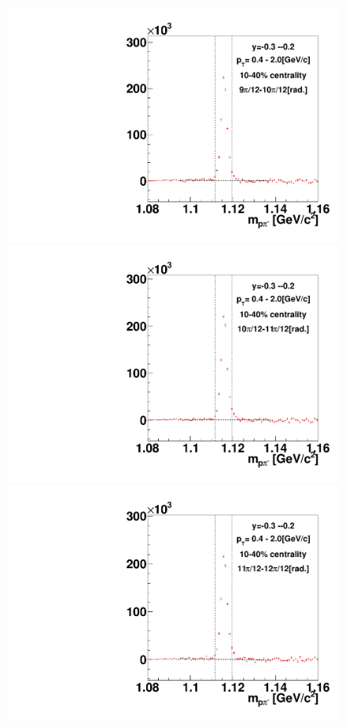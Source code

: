 \begin{figure}[h]
\includegraphics[width=0.14\linewidth]{chapterX/fig/ld_v1_sig/kf_ptslice0_cent1_ld_flow_phi10_rap7.pdf}
\includegraphics[width=0.14\linewidth]{chapterX/fig/ld_v1_sig/kf_ptslice0_cent1_ld_flow_phi11_rap7.pdf}
\includegraphics[width=0.14\linewidth]{chapterX/fig/ld_v1_sig/kf_ptslice0_cent1_ld_flow_phi12_rap7.pdf}


\end{figure}
